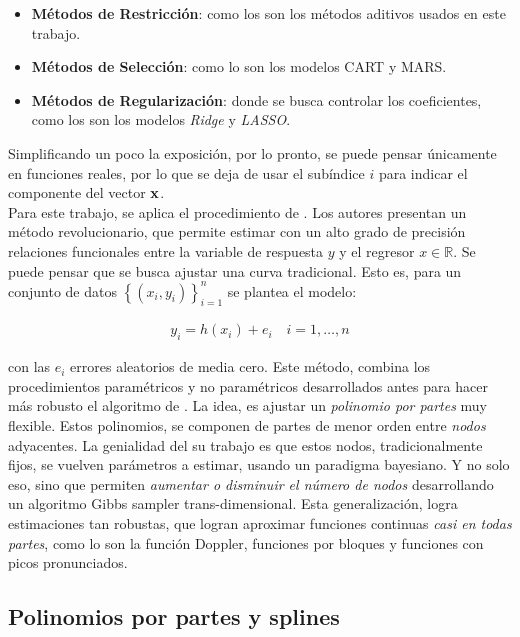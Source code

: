 \documentclass[../Main/Main.tex]{subfiles}
\begin{document}
\begin{itemize}
	\item \textbf{Métodos de Restricción}: como los son los métodos aditivos usados en este trabajo.
	\item \textbf{Métodos de Selección}: como lo son los modelos CART y MARS.
	\item \textbf{Métodos de Regularización}: donde se busca controlar los coeficientes, como los son los modelos \textit{Ridge} y  \textit{LASSO}.
\end{itemize}

Simplificando un poco la exposición, por lo pronto, se puede pensar únicamente en funciones reales, por lo que se deja de usar el subíndice $i$ para indicar el componente del vector $\mathbf{x}$.\\

Para este trabajo, se aplica el procedimiento de   \autocite{mallik1998automatic}. Los autores presentan un método revolucionario, que permite estimar con un alto grado de precisión relaciones funcionales entre la variable de respuesta $y$ y el regresor $x\in\mathbb{R}$. Se puede pensar que se busca ajustar una curva tradicional. Esto es, para un conjunto de datos $\left\{(x_i,y_i) \right\}_{i = 1}^n$ se plantea el modelo:

\begin{align}
	y_i = h(x_i) + e_i \quad i = 1,\ldots,n \label{ec:EstCurvas}
\end{align}

con las $e_i$ errores aleatorios de media cero. Este método, combina   los procedimientos paramétricos y no paramétricos desarrollados antes para hacer más robusto el algoritmo de \autocite{hastie1986generalized}. La idea, es ajustar un \textit{polinomio por partes} muy flexible. Estos polinomios, se componen de partes de menor orden entre \textit{nodos} adyacentes. La genialidad del su trabajo es que estos nodos, tradicionalmente fijos, se vuelven parámetros a estimar, usando un paradigma bayesiano. Y no solo eso, sino que permiten \textit{aumentar o disminuir el número de nodos} desarrollando un algoritmo Gibbs sampler trans-dimensional. Esta generalización, logra estimaciones tan robustas, que logran aproximar funciones continuas \textit{casi en todas partes}, como lo son la función Doppler, funciones por bloques y funciones con picos pronunciados. \\ 

\subsection{Polinomios por partes y splines} \label{sec:PolisYSplines}
\end{document}
